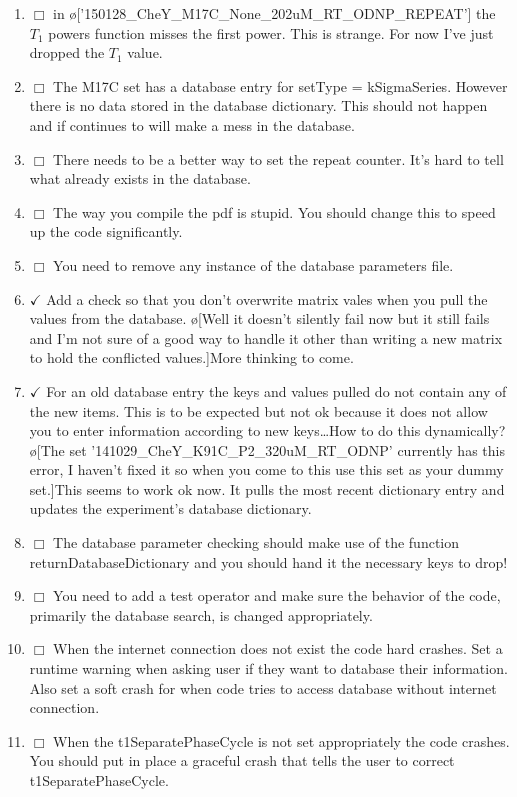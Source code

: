 \documentclass[10pt]{book}
\begin{document}
\begin{enumerate}
    \item $\Box$ in \o['150128_CheY_M17C_None_202uM_RT_ODNP_REPEAT']{} the $T_1$ powers function misses the first power. This is strange. For now I've just dropped the $T_1$ value.
    \item $\Box$ The M17C set has a database entry for setType = kSigmaSeries. However there is no data stored in the database dictionary. This should not happen and if continues to will make a mess in the database.
    \item $\Box$ There needs to be a better way to set the repeat counter. It's hard to tell what already exists in the database.
    \item $\Box$ The way you compile the pdf is stupid. You should change this to speed up the code significantly.
    \item $\Box$ You need to remove any instance of the database parameters file.
    \item $\checkmark$ Add a check so that you don't overwrite matrix vales when you pull the values from the database. \o[Well it doesn't silently fail now but it still fails and I'm not sure of a good way to handle it other than writing a new matrix to hold the conflicted values.]{More thinking to come.}
    \item $\checkmark$ For an old database entry the keys and values pulled do not contain any of the new items. This is to be expected but not ok because it does not allow you to enter information according to new keys\ldots How to do this dynamically? \o[The set '141029_CheY_K91C_P2_320uM_RT_ODNP' currently has this error, I haven't fixed it so when you come to this use this set as your dummy set.]{This seems to work ok now. It pulls the most recent dictionary entry and updates the experiment's database dictionary.}
    \item $\Box$ The database parameter checking should make use of the function returnDatabaseDictionary and you should hand it the necessary keys to drop!
    \item $\Box$ You need to add a test operator and make sure the behavior of the code, primarily the database search, is changed appropriately.
    \item $\Box$ When the internet connection does not exist the code hard crashes. Set a runtime warning when asking user if they want to database their information. Also set a soft crash for when code tries to access database without internet connection.
    \item $\Box$ When the t1SeparatePhaseCycle is not set appropriately the code crashes. You should put in place a graceful crash that tells the user to correct t1SeparatePhaseCycle.

\end{enumerate}
\end{document}
